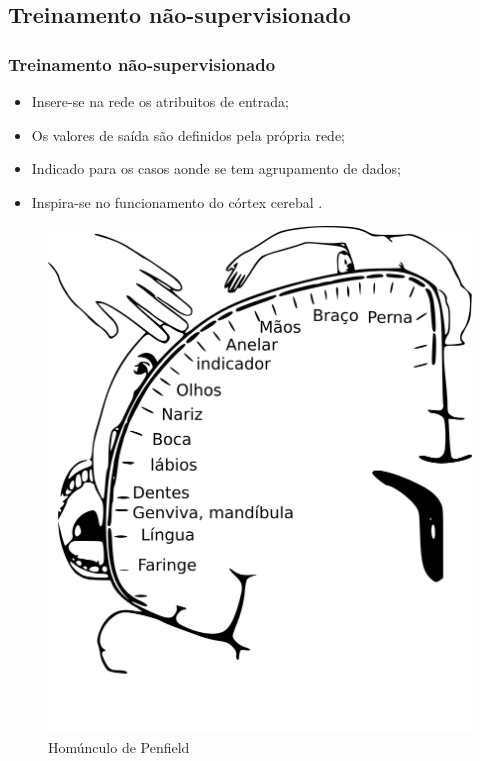 \documentclass[10pt]{beamer} %
\begin{document}
\subsection{Treinamento não-supervisionado}

\begin{frame}
	\frametitle{Treinamento não-supervisionado}
	\begin{itemize}
		\item  Insere-se na rede os atribuitos de entrada;
		\pause
		\item Os valores de saída são definidos pela própria rede;
		\pause
		\item Indicado para os casos aonde se tem agrupamento de dados;
		\pause
		\item Inspira-se no funcionamento do córtex cerebal \citep{Schott1993}.
	\end{itemize}
	
		\begin{figure}[H]
			\centering
			\includegraphics[scale=0.3]{Imagens/penfield.png}
			\caption{Homúnculo de Penfield }
			\label{penfield}
		\end{figure}
		
\end{frame}
\end{document}
